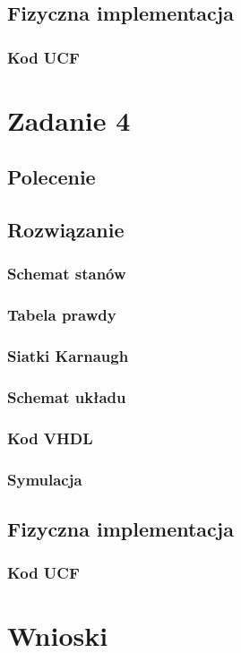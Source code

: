 \documentclass[a4paper,12pt]{extarticle}  %
\begin{document}
\subsection{Fizyczna implementacja}
\subsubsection{Kod UCF}

\section{Zadanie 4}
\subsection{Polecenie}
\subsection{Rozwiązanie}
\subsubsection{Schemat stanów}
\subsubsection{Tabela prawdy}
\subsubsection{Siatki Karnaugh}
\subsubsection{Schemat układu}
\subsubsection{Kod VHDL}
\subsubsection{Symulacja}
\subsection{Fizyczna implementacja}
\subsubsection{Kod UCF}

\section{Wnioski}
\end{document}
